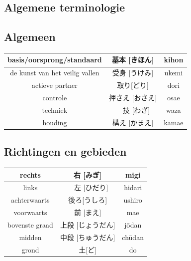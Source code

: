 \documentclass[12pt]{scrartcl}
\begin{document}
\begin{CJK*}{UTF8}{min}
\section{Algemene terminologie}
\subsection{Algemeen}
\begin{table}[H]
\begin{center}
\begin{tabular}{c|c|c}
basis/oorsprong/standaard & 基本 [きほん] & kihon \\
\hline
de kunst van het veilig vallen & 受身 [うけみ] & ukemi \\
\hline
actieve partner & 取り[どり] & dori\\
\hline
controle & 押さえ [おさえ] & osae\\
\hline
techniek &　技 [わざ] & waza\\
\hline
houding & 構え [かまえ] & kamae 
\end{tabular}
\end{center}
\end{table}

\subsection{Richtingen en gebieden}
\begin{table}[H]
\begin{center}
\begin{tabular}{c|c|c}
rechts & 右 [みぎ] & migi \\
\hline
links &　左 [ひだり] & hidari\\
\hline
achterwaarts & 後ろ[うしろ] & ushiro\\
\hline
voorwaarts & 前 [まえ] & mae\\
\hline
bovenste graad & 上段 [じょうだん] & j\={o}dan\\
\hline
midden & 中段 [ちゅうだん] & ch\={u}dan\\
\hline
grond & 土[ど] & do
\end{tabular}
\end{center}
\end{table}


\end{CJK*}
\end{document}
